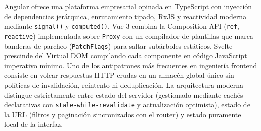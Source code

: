 \documentclass{book}
\begin{document}
Angular ofrece una plataforma empresarial opinada en TypeScript con inyección de dependencias jerárquica, enrutamiento tipado, RxJS y reactividad moderna mediante \texttt{signal()} y \texttt{computed()}. Vue 3 combina la Composition API (\texttt{ref}, \texttt{reactive}) implementada sobre \texttt{Proxy} con un compilador de plantillas que marca banderas de parcheo (\texttt{PatchFlags}) para saltar subárboles estáticos. Svelte prescinde del Virtual DOM compilando cada componente en código JavaScript imperativo mínimo.
Uno de los antipatrones más frecuentes en ingeniería frontend consiste en volcar respuestas HTTP crudas en un almacén global único sin políticas de invalidación, reintento ni deduplicación. La arquitectura moderna distingue estrictamente entre estado del servidor (gestionado mediante cachés declarativas con \texttt{stale-while-revalidate} y actualización optimista), estado de la URL (filtros y paginación sincronizados con el router) y estado puramente local de la interfaz.
\end{document}
